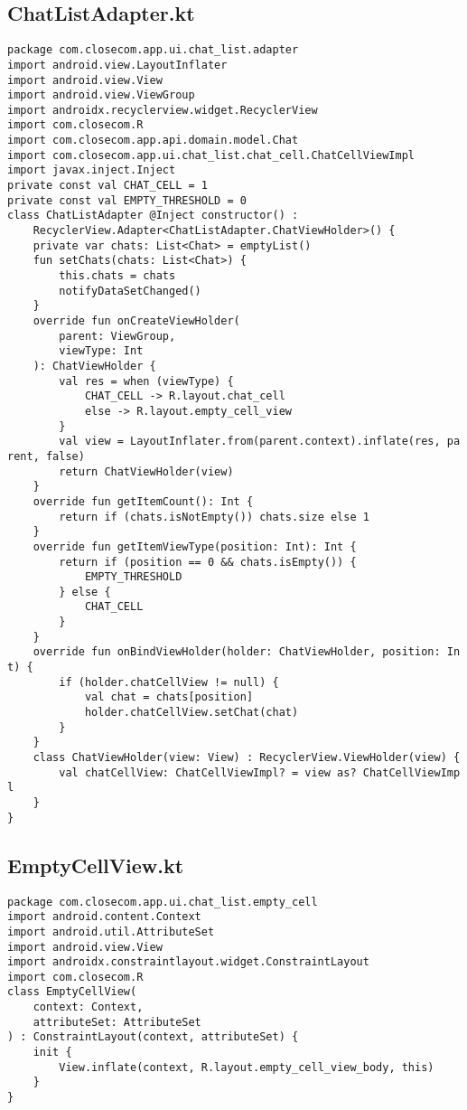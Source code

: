 \documentclass[listing]{espd}
\begin{document}
\subsection{ChatListAdapter.kt}
\begin{verbatim}
package com.closecom.app.ui.chat_list.adapter
import android.view.LayoutInflater
import android.view.View
import android.view.ViewGroup
import androidx.recyclerview.widget.RecyclerView
import com.closecom.R
import com.closecom.app.api.domain.model.Chat
import com.closecom.app.ui.chat_list.chat_cell.ChatCellViewImpl
import javax.inject.Inject
private const val CHAT_CELL = 1
private const val EMPTY_THRESHOLD = 0
class ChatListAdapter @Inject constructor() :
    RecyclerView.Adapter<ChatListAdapter.ChatViewHolder>() {
    private var chats: List<Chat> = emptyList()
    fun setChats(chats: List<Chat>) {
        this.chats = chats
        notifyDataSetChanged()
    }
    override fun onCreateViewHolder(
        parent: ViewGroup,
        viewType: Int
    ): ChatViewHolder {
        val res = when (viewType) {
            CHAT_CELL -> R.layout.chat_cell
            else -> R.layout.empty_cell_view
        }
        val view = LayoutInflater.from(parent.context).inflate(res, pa
rent, false)
        return ChatViewHolder(view)
    }
    override fun getItemCount(): Int {
        return if (chats.isNotEmpty()) chats.size else 1
    }
    override fun getItemViewType(position: Int): Int {
        return if (position == 0 && chats.isEmpty()) {
            EMPTY_THRESHOLD
        } else {
            CHAT_CELL
        }
    }
    override fun onBindViewHolder(holder: ChatViewHolder, position: In
t) {
        if (holder.chatCellView != null) {
            val chat = chats[position]
            holder.chatCellView.setChat(chat)
        }
    }
    class ChatViewHolder(view: View) : RecyclerView.ViewHolder(view) {
        val chatCellView: ChatCellViewImpl? = view as? ChatCellViewImp
l
    }
}
\end{verbatim}

\subsection{EmptyCellView.kt}
\begin{verbatim}
package com.closecom.app.ui.chat_list.empty_cell
import android.content.Context
import android.util.AttributeSet
import android.view.View
import androidx.constraintlayout.widget.ConstraintLayout
import com.closecom.R
class EmptyCellView(
    context: Context,
    attributeSet: AttributeSet
) : ConstraintLayout(context, attributeSet) {
    init {
        View.inflate(context, R.layout.empty_cell_view_body, this)
    }
}
\end{verbatim}
\end{document}
